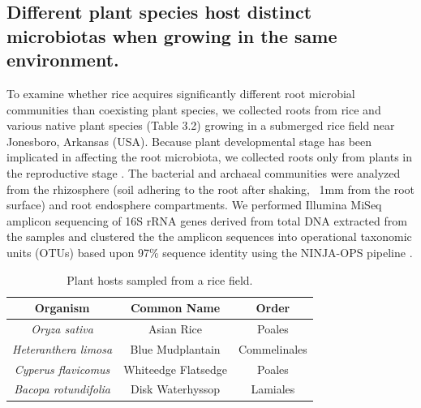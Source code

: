 \subsection{Different plant species host distinct microbiotas when growing in the same environment.}
To examine whether rice acquires significantly different root microbial communities than coexisting plant species, we collected roots from rice and various native plant species (Table 3.2) growing in a submerged rice field near Jonesboro, Arkansas (USA). Because plant developmental stage has been implicated in affecting the root microbiota, we collected roots only from plants in the reproductive stage \cite{Lundberg2012}. The bacterial and archaeal communities were analyzed from the rhizosphere (soil adhering to the root after shaking, ~1mm from the root surface) and root endosphere compartments. We performed Illumina MiSeq amplicon sequencing of 16S rRNA genes derived from total DNA extracted from the samples and clustered the the amplicon sequences into operational taxonomic units (OTUs) based upon 97\% sequence identity using the NINJA-OPS pipeline \cite{Al-Ghalith2016}.

\begin{table}[ht]
\centering
\small
{}
\caption[Table 3.2]{Plant hosts sampled from a rice field.}
\begin{tabular}{c|cc}
\hline
\textbf{Organism}& \textbf{Common Name} & \textbf{Order} \\
\hline
\rowcolor{Gray}
\textit{Oryza sativa}& Asian Rice & Poales \\
\textit{Heteranthera limosa}& Blue Mudplantain & Commelinales \\
\rowcolor{Gray}
\textit{Cyperus flavicomus}& Whiteedge Flatsedge & Poales \\
\textit{Bacopa rotundifolia}& Disk Waterhyssop & Lamiales \\
\hline
\end{tabular}
\end{table}

